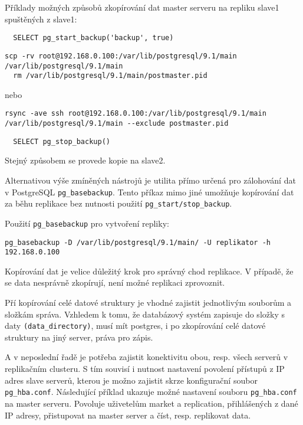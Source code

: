 Příklady možných způsobů zkopírování dat master serveru na repliku slave1 spuštěných z slave1:
\begin{lstlisting}
  SELECT pg_start_backup('backup', true)
\end{lstlisting}
\begin{lstlisting}[keywordstyle=\bfseries\color{purpurova7},identifierstyle=\color{black},stringstyle=\color{black}]
  scp -rv root@192.168.0.100:/var/lib/postgresql/9.1/main /var/lib/postgresql/9.1/main
  rm /var/lib/postgresql/9.1/main/postmaster.pid
\end{lstlisting}
\begin{center}
nebo 
\end{center}
\begin{lstlisting}[keywordstyle=\bfseries\color{purpurova7},identifierstyle=\color{black},stringstyle=\color{black}]
  rsync -ave ssh root@192.168.0.100:/var/lib/postgresql/9.1/main /var/lib/postgresql/9.1/main --exclude postmaster.pid
\end{lstlisting}
\begin{lstlisting}
  SELECT pg_stop_backup()
\end{lstlisting}

Stejný způsobem se provede kopie na slave2. 

Alternativou výše zmíněných nástrojů je utilita přímo určená pro zálohování dat v PostgreSQL \texttt{pg\_basebackup}. Tento příkaz mimo jiné umožňuje kopírování dat za běhu replikace bez nutnosti použití \texttt{pg\_start/stop\_backup}.

Použití \texttt{pg\_basebackup} pro vytvoření repliky:
\begin{lstlisting}[keywordstyle=\bfseries\color{purpurova7},identifierstyle=\color{black},stringstyle=\color{black}]
  pg_basebackup -D /var/lib/postgresql/9.1/main/ -U replikator -h 192.168.0.100
\end{lstlisting}

Kopírování dat je velice důležitý krok pro správný chod replikace. V případě, že se data nesprávně zkopírují, není možné replikaci zprovoznit. 

Pří kopírování celé datové struktury je vhodné zajistit jednotlivým souborům a složkám správa. Vzhledem k tomu, že databázový systém zapisuje do složky s daty \texttt{(data\_directory)}, musí mít postgres, i po zkopírování celé datové struktury na jiný server, práva pro zápis.

A v neposlední řadě je potřeba zajistit konektivitu obou, resp. všech serverů v replikačním clusteru. S tím souvisí i nutnost nastavení povolení přístupů z IP adres slave serverů, kterou je možno zajistit skrze konfigurační soubor \texttt{pg\_hba.conf}. Následující příklad ukazuje možné nastavení souboru \texttt{pg\_hba.conf} na master serveru. Povoluje uživetelům market a replication, přihlášených z dané IP adresy, přistupovat na master server a číst, resp. replikovat data.

